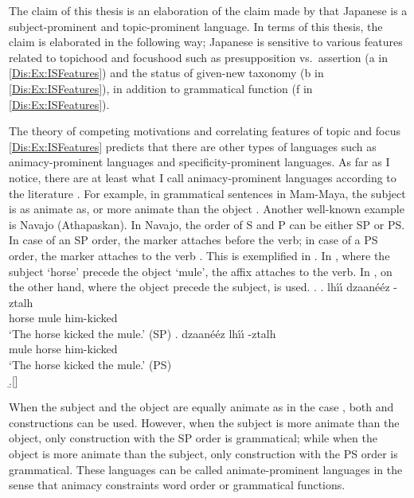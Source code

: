 The claim of this thesis is an elaboration of the claim made by
 that
Japanese is a subject-prominent and topic-prominent language.
In terms of this thesis,
the claim is elaborated in the following way;
Japanese is sensitive to various features related to topichood and focushood such as presupposition vs.~assertion (a in \ref{Dis:Ex:ISFeatures})
and the status of given-new taxonomy (b in \ref{Dis:Ex:ISFeatures}),
in addition to grammatical function (f in \ref{Dis:Ex:ISFeatures}).

The theory of competing motivations and correlating features of topic and focus \ref{Dis:Ex:ISFeatures} predicts that
there are other types of languages such as animacy-prominent languages and specificity-prominent languages.
As far as I notice,
there are at least what I call animacy-prominent languages according to the literature \cite[]{dahlfraurud96,minkoff00,deswartetal07}.
For example, in grammatical sentences in Mam-Maya,
the subject is as animate as, or more animate than the object \cite{minkoff00}.
Another well-known example is Navajo (Athapaskan).
In Navajo, the order of S and P can be either SP or PS.
In case of an SP order, the marker  attaches before the verb;
in case of a PS order, the marker  attaches to the verb \cite{hale72,frischberg72}.
This is exemplified in \Next.
In \Next[a],
where the subject `horse' precede the object `mule',
the affix  attaches to the verb.
In \Next[b], on the other hand,
where the object precede the subject,
 is used.
%
\ex.
 \ag. lh\'{\i}\'{\i} dzaan\'e\'ez -ztalh \\
      horse mule him-kicked \\
      `The horse kicked the mule.' \hfill{(SP)}
 \bg. dzaan\'e\'ez lh\'{\i}\'{\i} -ztalh \\
      mule horse him-kicked \\
      `The horse kicked the mule.' \hfill{(PS)}\\
 \b.[] \hfill{\cite[300]{hale72}}

When the subject and the object are equally animate as in the case \Last,
both  and  constructions can be used.
However,
when the subject is more animate than the object,
only construction with the SP order is grammatical;
while when the object is more animate than the subject,
only  construction with the PS order is grammatical.
These languages can be called animate-prominent languages
in the sense that
animacy constraints word order or grammatical functions.



